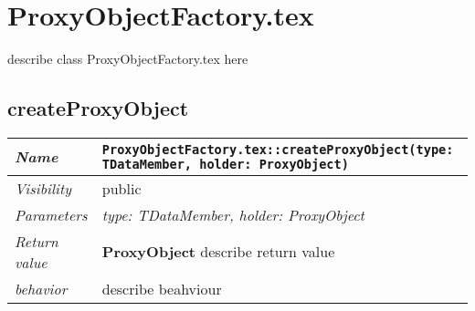 \chapter{ProxyObjectFactory.tex}
describe class ProxyObjectFactory.tex here
\section{createProxyObject}
\begin{longtable}{p{3cm} @{\hskip 1cm} p{12cm}}
 \hline
\textit{Name} & \texttt{ProxyObjectFactory.tex::createProxyObject(type: TDataMember, holder: ProxyObject)}\\
\hline
 \textit{Visibility} & public\\
\hline
\textit{Parameters} & \textit{type: TDataMember, holder: ProxyObject}\\
\hline
\textit{Return value} & \textbf{ ProxyObject} describe return value\\
  \hline
 \textit{behavior} & describe beahviour \\
\hline
\end{longtable} \pagebreak
 